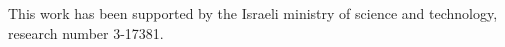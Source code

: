 This work has been supported by the Israeli ministry of science and technology, research number 3-17381.